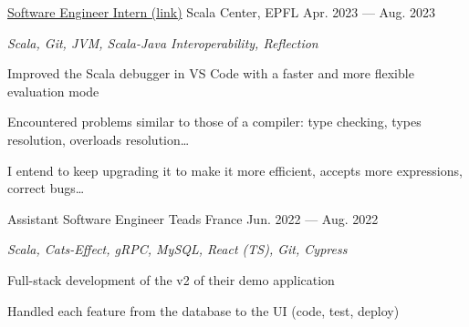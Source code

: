 \begin{MainPart}
  \Experience%
  {\href{https://github.com/scalacenter/scala-debug-adapter/pulls?q=is\%3Apr+author\%3Aiusildra+}{Software Engineer Intern (link)}}
  {Scala Center, EPFL}
  {Apr. 2023 --- Aug. 2023}
  {
    \textit{Scala, Git, JVM, Scala-Java Interoperability, Reflection}
    \begin{ItemList}{\ColorHighlight}
      \item[\ding{226}] Improved the Scala debugger in VS Code with a faster and more flexible evaluation mode
      \item[\ding{226}] Encountered problems similar to those of a compiler: type checking, types resolution, overloads resolution\dots
      \item[\ding{226}] I entend to keep upgrading it to make it more efficient, accepts more expressions, correct bugs\dots
    \end{ItemList}
  }
  \Experience%
  {Assistant Software Engineer}
  {Teads France}
  {Jun. 2022 --- Aug. 2022}
  {
    \textit{Scala, Cats-Effect, gRPC, MySQL, React (TS), Git, Cypress}

    \begin{ItemList}{\ColorHighlight}
      \item[\ding{226}] Full-stack development of the v2 of their demo application
      \item[\ding{226}] Handled each feature from the database to the UI (code, test, deploy)
    \end{ItemList}
  }
\end{MainPart}